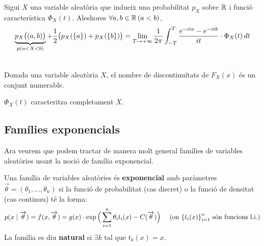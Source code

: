 \begin{thm}[(d'inversió)]
  Sigui $X$ una variable aleatòria que indueix una probabilitat $p_{X}$ sobre $\mathbb{R}$ i funció característica $\Phi_{X}(t)$. Aleshores $\forall a,b\in \mathbb{R} \, (a<b)$,
  \[
    \underbrace{p_{X}\big((a,b)\big)}_{p(a<X<b)} + \frac{1}{2}\big(p_{X}(\left\{a\right\})+p_{X}(\left\{b\right\}) \big) = \lim_{T\to+\infty}\frac{1}{2\pi}\int_{-T}^{T}\frac{e^{-ita}-e^{-itb}}{it}\cdot\Phi_{X}(t) \, dt
  \]
\end{thm}

\begin{lema} \-\\
  Donada una variable aleatòria $X$, el nombre de discontinuïtats de $F_{X}(x)$ és un conjunt numerable.
\end{lema}

\begin{col}
  $\Phi_{X}(t)$ caracteritza completament $X$.
\end{col}

\subsection{Famílies exponencials}

Ara veurem que podem tractar de manera molt general famílies de variables aleatòries usant la noció de família exponencial.

\begin{defi}
  Una família de variables aleatòries és \textbf{exponencial} amb paràmetres $\overrightarrow{\theta} = (\theta_{1},\ldots,\theta_{n})$ si la funció de probabilitat (cas discret) o la funció de densitat (cas continuu) té la forma:
  \[
    p(x\mid \overrightarrow{\theta}) = f(x,\overrightarrow{\theta}) = g(x)\cdot \exp\Big(\sum_{i=1}^{n}\theta_{i}t_{i}(x)-C(\overrightarrow{\theta})\Big) \quad \text{ (on $\left\{t_{i}(x)\right\}_{i=1}^{n}$ són funcions l.i.)}
  \]
  La família es diu \textbf{natural} si $\exists k$ tal que $t_{k}(x)=x$.
\end{defi}

